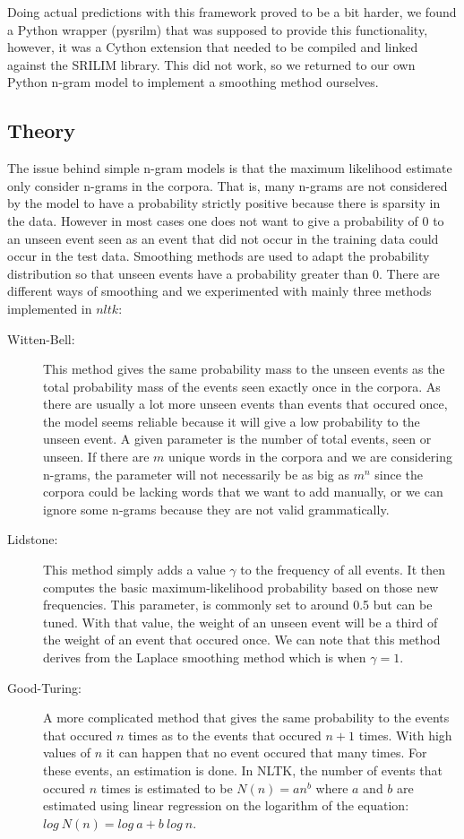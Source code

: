 \documentclass[a4paper,12pt]{article}
\begin{document}
Doing actual predictions with this framework proved to be a bit harder, we found a Python wrapper (pysrilm) that was supposed to provide this functionality, however, it was a Cython extension that needed to be compiled and linked against the SRILIM library. This did not work, so we returned to our own Python n-gram model to implement a smoothing method ourselves.

\label{sec:ngramsmoothing}

\subsection{Theory}
	The issue behind simple n-gram models is that the maximum likelihood estimate only consider n-grams in the corpora. That is, many n-grams are not considered by the model to have a probability strictly positive because there is sparsity in the data. However in most cases one does not want to give a probability of 0 to an unseen event seen as an event that did not occur in the training data could occur in the test data. Smoothing methods are used to adapt the probability distribution so that unseen events have a probability greater than 0. There are different ways of smoothing and we experimented with mainly three methods implemented in $nltk$:
	
	\begin{description}
		\item[Witten-Bell:] This method gives the same probability mass to the unseen events as the total probability mass of the events seen exactly once in the corpora. As there are usually a lot more unseen events than events that occured once, the model seems reliable because it will give a low probability to the unseen event. A given parameter is the number of total events, seen or unseen. If there are $m$ unique words in the corpora and we are considering n-grams, the parameter will not necessarily be as big as $m^n$ since the corpora could be lacking words that we want to add manually, or we can ignore some n-grams because they are not valid grammatically.
		\item[Lidstone:] This method simply adds a value $\gamma$ to the frequency of all events. It then computes the basic maximum-likelihood probability based on those new frequencies. This parameter, is commonly set to around 0.5 but can be tuned. With that value, the weight of an unseen event will be a third of the weight of an event that occured once. We can note that this method derives from the Laplace smoothing method which is when $\gamma = 1$.
		\item[Good-Turing:] A more complicated method that gives the same probability to the events that occured $n$ times as to the events that occured $n+1$ times. With high values of $n$ it can happen that no event occured that many times. For these events, an estimation is done. In NLTK, the number of events that occured $n$ times is estimated to be $N(n) = an^b$ where $a$ and $b$ are estimated using linear regression on the logarithm of the equation: $log\ N(n) = log\ a + b\ log\ n$.
	\end{description}
	
\end{document}
